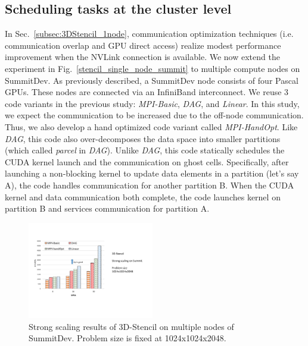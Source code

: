 \subsection{Scheduling tasks at the cluster level}
In Sec.~\ref{subsec:3DStencil_1node}, communication optimization techniques (i.e. communication overlap and GPU direct access) realize modest performance improvement when the NVLink connection is available.
We now extend the experiment in Fig.~\ref{stencil_single_node_summit} to multiple compute nodes on SummitDev.
As previously described, a SummitDev node consists of four Pascal GPUs.
These nodes are connected via an InfiniBand interconnect.
We reuse 3 code variants in the previous study: {\em MPI-Basic}, {\em DAG}, and {\em Linear}. 
In this study, we expect the communication to be increased  due to the off-node communication.
Thus, we also develop a hand optimized code variant called {\em MPI-HandOpt}.
Like {\em DAG}, this code also over-decomposes the data space into smaller partitions (which called {\em parcel} in {\em DAG}).
Unlike {\em DAG}, this code statically schedules the CUDA kernel launch and the communication on ghost cells.
Specifically, after launching a non-blocking kernel to update data elements in a partition (let's say A), the code handles communication for another partition B.
When the CUDA kernel and data communication both complete, the code launches kernel on partition B and services communication for partition A.


\begin{figure}[htb]
\centering
\includegraphics[width=0.49\textwidth]{figures/stencil_multiple_nodes_summit.pdf}
\caption{Strong scaling results of 3D-Stencil on multiple nodes of SummitDev. Problem size is fixed at 1024x1024x2048.}
\label{fig:stencil_multiple_nodes}
\end{figure}


